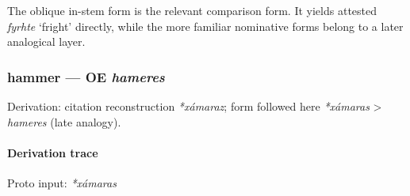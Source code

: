 \documentclass[
  british,
  a4paper,
]{article}
\begin{document}
The oblique in-stem form is the relevant comparison form. It yields
attested {\emph{fyrhte}} `fright' directly, while the more familiar
nominative forms belong to a later analogical layer.

\subsubsection{\texorpdfstring{hammer --- OE
\emph{hameres}}{hammer --- OE hameres}}\label{hammer-oe-hameres}

Derivation: citation reconstruction \emph{*xámaraz}; form followed here
\emph{*xámaras} \textgreater{} \emph{hameres} (late analogy).

\paragraph{Derivation trace}\label{derivation-trace-128}

Proto input: \emph{*xámaras}

\begingroup
\setlength{\fboxsep}{6pt}

\noindent{} \endgroup
\end{document}

